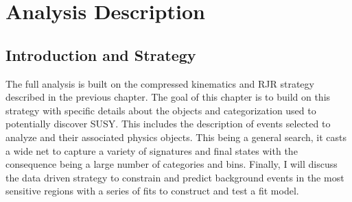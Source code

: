 
\setcounter{secnumdepth}{3}
\setcounter{tocdepth}{3}
\setlength{\parskip}{\smallskipamount}
\setlength{\parindent}{0pt}


\makeatletter


\providecommand{\tabularnewline}{\\}


\makeatother

%

\chapter{Analysis Description }

\section{Introduction and Strategy}
The full analysis is built on the compressed kinematics and RJR strategy described in the previous chapter. The goal of this chapter is to build on this strategy with specific details about the objects and categorization used to potentially discover SUSY. This includes the description of events selected to analyze and their associated physics objects. This being a general search, it casts a wide net to capture a variety of signatures and final states with the consequence being a large number of categories and bins. Finally, I will discuss the data driven strategy to constrain and predict background events in the most sensitive regions with a series of fits to construct and test a fit model.

 
